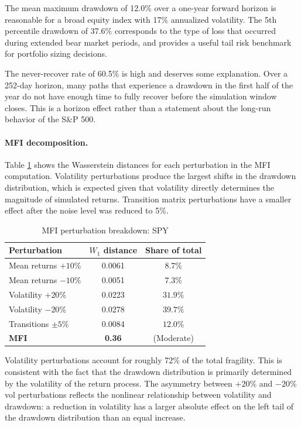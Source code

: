 \documentclass[12pt]{article}
\begin{document}
The mean maximum drawdown of 12.0\% over a one-year forward horizon is reasonable for
a broad equity index with 17\% annualized volatility. The 5th percentile drawdown of
37.6\% corresponds to the type of loss that occurred during extended bear market
periods, and provides a useful tail risk benchmark for portfolio sizing decisions.

The never-recover rate of 60.5\% is high and deserves some explanation. Over a 252-day
horizon, many paths that experience a drawdown in the first half of the year do not
have enough time to fully recover before the simulation window closes. This is a
horizon effect rather than a statement about the long-run behavior of the S\&P 500.

\paragraph{MFI decomposition.}

Table \ref{tab:spy_mfi} shows the Wasserstein distances for each perturbation in the
MFI computation. Volatility perturbations produce the largest shifts in the drawdown
distribution, which is expected given that volatility directly determines the magnitude
of simulated returns. Transition matrix perturbations have a smaller effect after
the noise level was reduced to 5\%.

\begin{table}[h]
\centering
\caption{MFI perturbation breakdown: SPY}
\label{tab:spy_mfi}
\begin{tabular}{lcc}
\toprule
Perturbation & $W_1$ distance & Share of total \\
\midrule
Mean returns $+10\%$ & 0.0061 & $8.7\%$  \\
Mean returns $-10\%$ & 0.0051 & $7.3\%$  \\
Volatility $+20\%$   & 0.0223 & $31.9\%$ \\
Volatility $-20\%$   & 0.0278 & $39.7\%$ \\
Transitions $\pm 5\%$ & 0.0084 & $12.0\%$ \\
\midrule
\textbf{MFI} & \textbf{0.36} & (Moderate) \\
\bottomrule
\end{tabular}
\end{table}

Volatility perturbations account for roughly 72\% of the total fragility. This is
consistent with the fact that the drawdown distribution is primarily determined by
the volatility of the return process. The asymmetry between $+20\%$ and $-20\%$ vol
perturbations reflects the nonlinear relationship between volatility and drawdown:
a reduction in volatility has a larger absolute effect on the left tail of the
drawdown distribution than an equal increase.
\end{document}
